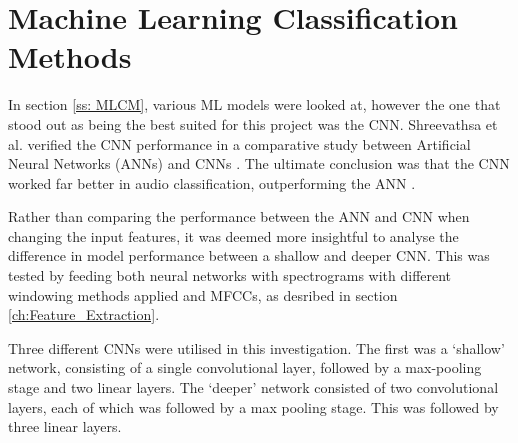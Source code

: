 \documentclass[class=report,11pt,crop=false]{standalone}
\begin{document}
\ifstandalone
\tableofcontents
\fi
\section{Machine Learning Classification Methods \label{ch:ML_Methods}}




In section \ref{ss: MLCM}, various ML models were looked at, however the one that stood out as being the best suited for this project was the CNN. Shreevathsa et al.  verified the CNN performance in a comparative study between Artificial Neural Networks (ANNs) and CNNs \cite{Shreevathsa_2020}. The ultimate conclusion was that the CNN worked far better in audio classification, outperforming the ANN \cite{Shreevathsa_2020}. 

Rather than comparing the performance between the ANN and CNN when changing the input features, it was deemed more insightful to analyse the difference in model performance between a shallow and deeper CNN. This was tested by feeding both neural networks with spectrograms with different windowing methods applied and MFCCs, as desribed in section \ref{ch:Feature_Extraction}. 

Three different CNNs were utilised in this investigation. The first was a `shallow' network, consisting of a single convolutional layer, followed by a max-pooling stage and two linear layers. The `deeper' network consisted of two convolutional layers, each of which was followed by a max pooling stage. This was followed by three linear layers. 
\end{document}
